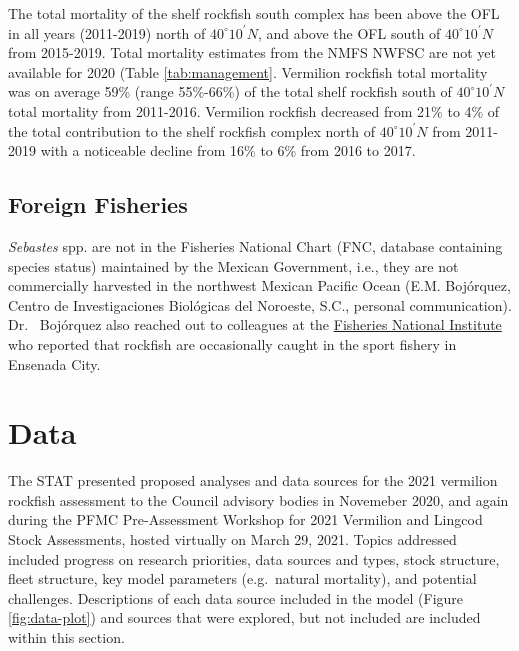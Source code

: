 \documentclass[11pt,
  english,
  a4paper,
]{article}
\begin{document}
The total mortality of the shelf rockfish south complex has been above the OFL in all years (2011-2019) north of $40^\circ 10^\prime N$, and above the OFL south of $40^\circ 10^\prime N$ from 2015-2019. Total mortality estimates from the NMFS NWFSC are not yet available for 2020 (Table \ref{tab:management}. Vermilion rockfish total mortality was on average 59\% (range 55\%-66\%) of the total shelf rockfish south of $40^\circ 10^\prime N$ total mortality from 2011-2016. Vermilion rockfish decreased from 21\% to 4\% of the total contribution to the shelf rockfish complex north of $40^\circ 10^\prime N$ from 2011-2019 with a noticeable decline from 16\% to 6\% from 2016 to 2017.


\hypertarget{foreign-fisheries}{%
\subsection{Foreign Fisheries}\label{foreign-fisheries}}

\leavevmode\tagmcend\tagstructend

\emph{Sebastes} spp. are not in the Fisheries National Chart (FNC, database containing species status) maintained by the Mexican Government, i.e., they are not commercially harvested in the northwest Mexican Pacific Ocean (E.M. Bojórquez, Centro de Investigaciones Biológicas del Noroeste, S.C., personal communication). Dr.~ Bojórquez also reached out to colleagues at the {\href{https://www.gob.mx/inapesca}{Fisheries National Institute}\leavevmode\tagmcend\tagstructend} who reported that rockfish are occasionally caught in the sport fishery in Ensenada City.


\hypertarget{data}{%
\section{Data}\label{data}}

\leavevmode\tagmcend\tagstructend

The STAT presented proposed analyses and data sources for the 2021 vermilion rockfish assessment to the Council advisory bodies in Novemeber 2020, and again during the PFMC Pre-Assessment Workshop for 2021 Vermilion and Lingcod Stock Assessments, hosted virtually on March 29, 2021. Topics addressed included progress on research priorities, data sources and types, stock structure, fleet structure, key model parameters (e.g.~natural mortality), and potential challenges. Descriptions of each data source included in the model (Figure \ref{fig:data-plot}) and sources that were explored, but not included are included within this section.
\end{document}

